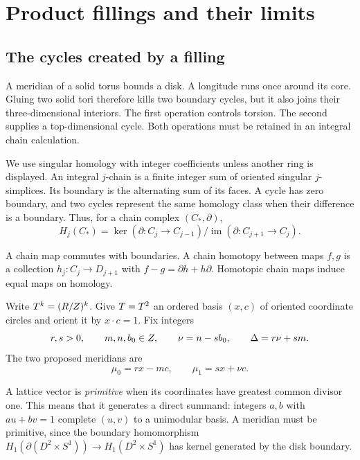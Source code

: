 \section{Product fillings and their limits}\label{sec:product-fillings}

\subsection{The cycles created by a filling}

A meridian of a solid torus bounds a disk.  A longitude runs once around
its core.  Gluing two solid tori therefore kills two boundary cycles,
but it also joins their three-dimensional interiors.  The first operation
controls torsion.  The second supplies a top-dimensional cycle.
Both operations must be retained in an integral chain calculation.

We use singular homology with integer coefficients unless another ring
is displayed.  An integral $j$-chain is a finite integer sum of oriented
singular $j$-simplices.  Its boundary is the alternating sum of its faces.
A cycle has zero boundary, and two cycles represent the same homology
class when their difference is a boundary.  Thus, for a chain complex
$(C_*,\partial)$,
\[
 H_j(C_*)=\ker(\partial:C_j\to C_{j-1})/
                 \operatorname{im}(\partial:C_{j+1}\to C_j).
\]

A chain map commutes with boundaries.  A chain homotopy between maps
$f,g$ is a collection $h_j:C_j\to D_{j+1}$ with
$f-g=\partial h+h\partial$.  Homotopic chain maps induce equal maps
on homology.

Write $T^k=(R/Z)^k$.  Give $T=T^2$ an ordered basis
$(x,c)$ of oriented coordinate circles and orient it by $x\cdot c=1$.
Fix integers
\begin{equation}\label{prod:eq:data}
 r,s>0,\qquad m,n,b_0\in Z,\qquad
 \nu=n-sb_0,\qquad \Delta=r\nu+sm.
\end{equation}
The two proposed meridians are
\begin{equation}\label{prod:eq:slopes}
                  \mu_0=rx-mc,\qquad \mu_1=sx+\nu c.
\end{equation}

A lattice vector is \emph{primitive} when its coordinates have greatest
common divisor one.  This means that it generates a direct summand:
integers $a,b$ with $au+bv=1$ complete $(u,v)$ to a unimodular basis.
A meridian must be primitive, since the boundary homomorphism
$H_1(\partial(D^2\times S^1))\to H_1(D^2\times S^1)$ has
kernel generated by the disk boundary.

